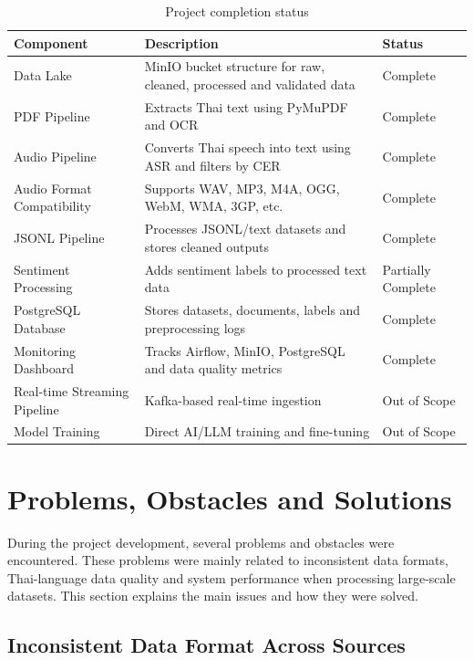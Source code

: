 \documentclass[12pt,oneside,openright,a4paper]{cpe-english-project}
\begin{document}
\begin{table}[H]
\centering
\caption{Project completion status}\label{tbl:completion}
\begin{tabular}{|p{}|p{}|p{}|}
\hline
\textbf{Component} & \textbf{Description} & \textbf{Status} \\ \hline
Data Lake & MinIO bucket structure for raw, cleaned, processed and validated data & Complete \\ \hline
PDF Pipeline & Extracts Thai text using PyMuPDF and OCR & Complete \\ \hline
Audio Pipeline & Converts Thai speech into text using ASR and filters by CER & Complete \\ \hline
Audio Format Compatibility & Supports WAV, MP3, M4A, OGG, WebM, WMA, 3GP, etc. & Complete \\ \hline
JSONL Pipeline & Processes JSONL/text datasets and stores cleaned outputs & Complete \\ \hline
Sentiment Processing & Adds sentiment labels to processed text data & Partially Complete \\ \hline
PostgreSQL Database & Stores datasets, documents, labels and preprocessing logs & Complete \\ \hline
Monitoring Dashboard & Tracks Airflow, MinIO, PostgreSQL and data quality metrics & Complete \\ \hline
Real-time Streaming Pipeline & Kafka-based real-time ingestion & Out of Scope \\ \hline
Model Training & Direct AI/LLM training and fine-tuning & Out of Scope \\ \hline
\end{tabular}
\end{table}

\section{Problems, Obstacles and Solutions}

During the project development, several problems and obstacles were encountered. These problems were mainly related to inconsistent data formats, Thai-language data quality and system performance when processing large-scale datasets. This section explains the main issues and how they were solved.

\subsection{Inconsistent Data Format Across Sources}
\end{document}
